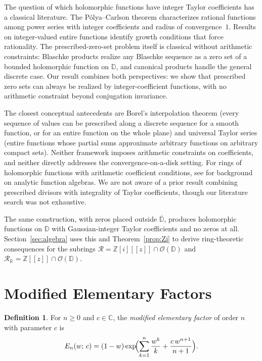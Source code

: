 \documentclass{amsart}
\theoremstyle{definition}
\newtheorem{definition}[theorem]{Definition}
\newcommand{\D}{\mathbb{D}}
\newcommand{\Z}{\mathbb{Z}}
\newcommand{\Zi}{\mathbb{Z}[i]}
\newcommand{\C}{\mathbb{C}}
\newcommand{\OD}{\mathcal{O}(\D)}
\newcommand{\mR}{\mathcal{R}}
\newcommand{\mRR}{\mathcal{R}_{\mathbb{R}}}
\begin{document}
\medskip

The question of which holomorphic functions have integer Taylor
coefficients has a classical literature.  The P\'olya--Carlson theorem
\cite{PC} characterizes rational functions among power series with
integer coefficients and radius of convergence~$1$.  Results on
integer-valued entire functions \cite{Gel} identify growth conditions
that force rationality.  The prescribed-zero-set problem itself is
classical without arithmetic constraints: Blaschke products realize
any Blaschke sequence as a zero set of a bounded holomorphic function
on $\D$, and canonical products \cite{Conway,Levin} handle the general
discrete case.  Our result combines both perspectives: we show that
prescribed zero sets can always be realized by integer-coefficient
functions, with no arithmetic constraint beyond conjugation invariance.

The closest conceptual antecedents are Borel's interpolation theorem
(every sequence of values can be prescribed along a discrete sequence
for a smooth function, or for an entire function on the whole plane)
and universal Taylor series (entire functions whose partial sums
approximate arbitrary functions on arbitrary compact sets).  Neither
framework imposes arithmetic constraints on coefficients, and neither
directly addresses the convergence-on-a-disk setting.  For rings of
holomorphic functions with arithmetic coefficient conditions, see
\cite{Stout} for background on analytic function algebras.  We are not aware of a prior result combining prescribed divisors with
integrality of Taylor coefficients, though our literature search was
not exhaustive.

The same construction, with zeros placed outside $\overline{\D}$,
produces holomorphic functions on $\D$ with Gaussian-integer Taylor
coefficients and no zeros at all.  Section~\ref{sec:algebra} uses this
and Theorem~\ref{prop:Zi} to derive ring-theoretic consequences for
the subrings $\mR = \Zi[[z]] \cap \OD$ and $\mRR = \Z[[z]] \cap \OD$.

\section{Modified Elementary Factors}
\label{sec:factors}

\begin{definition}
For $n \geq 0$ and $c \in \C$, the \emph{modified elementary factor}
of order $n$ with parameter $c$ is
\[
  E_n(w;\,c)
  = (1-w)\exp\!\Bigl(\sum_{k=1}^{n}\frac{w^k}{k} + \frac{c\,w^{n+1}}{n+1}\Bigr).
\]
\end{definition}
\end{document}
